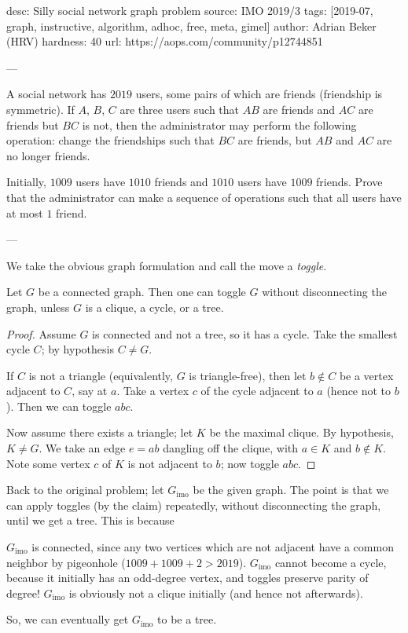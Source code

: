 desc: Silly social network graph problem
source: IMO 2019/3
tags: [2019-07, graph, instructive, algorithm, adhoc, free, meta, gimel]
author: Adrian Beker (HRV)
hardness: 40
url: https://aops.com/community/p12744851

---

A social network has $2019$ users,
some pairs of which are friends (friendship is symmetric).
If $A$, $B$, $C$ are three users such that
$AB$ are friends and $AC$ are friends but $BC$ is not,
then the administrator may perform the following operation:
change the friendships such that $BC$ are friends,
but $AB$ and $AC$ are no longer friends.

Initially, $1009$ users have $1010$ friends
and $1010$ users have $1009$ friends.
Prove that the administrator can make a sequence of operations
such that all users have at most $1$ friend.

---

We take the obvious graph formulation
and call the move a \emph{toggle}.

\begin{claim*}
  Let $G$ be a connected graph.
  Then one can toggle $G$ without disconnecting the graph,
  unless $G$ is a clique, a cycle, or a tree.
\end{claim*}
\begin{proof}
  Assume $G$ is connected and not a tree, so it has a cycle.
  Take the smallest cycle $C$; by hypothesis $C \neq G$.

  If $C$ is not a triangle (equivalently, $G$ is triangle-free),
  then let $b \notin C$ be a vertex adjacent to $C$, say at $a$.
  Take a vertex $c$ of the cycle adjacent to $a$ (hence not to $b$).
  Then we can toggle $abc$.

  Now assume there exists a triangle; let $K$ be the maximal clique.
  By hypothesis, $K \neq G$.
  We take an edge $e = ab$ dangling off the clique,
  with $a \in K$ and $b \notin K$.
  Note some vertex $c$ of $K$ is not adjacent to $b$; now toggle $abc$.
\end{proof}

Back to the original problem;
let $G_{\text{imo}}$ be the given graph.
The point is that we can apply toggles (by the claim) repeatedly,
without disconnecting the graph, until we get a tree.
This is because
\begin{itemize}
  \ii $G_{\text{imo}}$ is connected,
  since any two vertices which are not adjacent
  have a common neighbor by pigeonhole
  ($1009 + 1009 + 2 > 2019$).
  \ii $G_{\text{imo}}$ cannot become a cycle,
  because it initially has an odd-degree vertex,
  and toggles preserve parity of degree!
  \ii $G_{\text{imo}}$ is obviously not a clique initially
  (and hence not afterwards).
\end{itemize}
So, we can eventually get $G_{\text{imo}}$ to be a tree.

